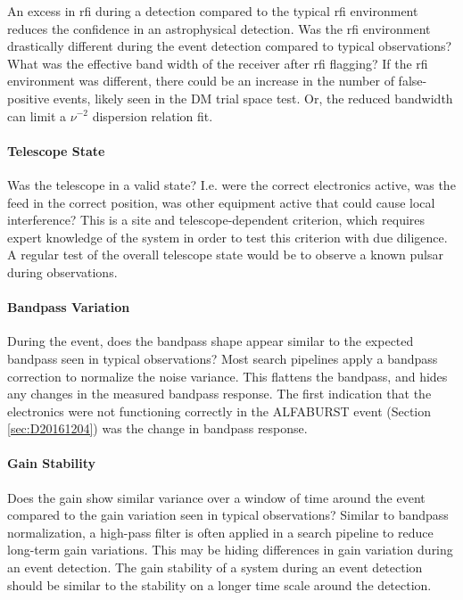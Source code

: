 \documentclass[a4paper,fleqn,usenatbib]{mnras}
\begin{document}
An excess in \gls{rfi} during a detection compared to the typical \gls{rfi}
environment reduces the confidence in an astrophysical detection.  Was the
\gls{rfi} environment drastically different during the event detection compared
to typical observations? What was the effective band width of the receiver after
\gls{rfi} flagging? If the \gls{rfi} environment was different, there could be
an increase in the number of false-positive events, likely seen in the DM trial
space test. Or, the reduced bandwidth can limit a $\nu^{-2}$ dispersion relation
fit.

\paragraph{Telescope State}

Was the telescope in a valid state? I.e. were the correct electronics active,
was the feed in the correct position, was other equipment active that could
cause local interference? This is a site and telescope-dependent criterion,
which requires expert knowledge of the system in order to test this criterion
with due diligence.  A regular test of the overall telescope state would be to
observe a known pulsar during observations.

\paragraph{Bandpass Variation}

During the event, does the bandpass shape appear similar to the expected
bandpass seen in typical observations? Most search pipelines apply a bandpass
correction to normalize the noise variance. This flattens the bandpass, and
hides any changes in the measured bandpass response. The first indication that
the electronics were not functioning correctly in the ALFABURST event (Section
\ref{sec:D20161204}) was the change in bandpass response.

\paragraph{Gain Stability}

Does the gain show similar variance over a window of time around the event
compared to the gain variation seen in typical observations? Similar to bandpass
normalization, a high-pass filter is often applied in a search pipeline to
reduce long-term gain variations. This may be hiding differences in gain
variation during an event detection. The gain stability of a system during an
event detection should be similar to the stability on a longer time scale around
the detection.
\end{document}
